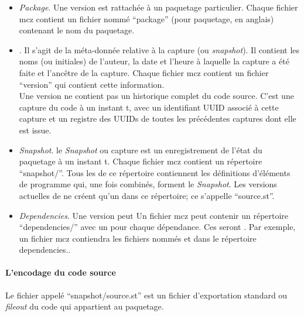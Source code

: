 \documentclass[a4paper,10pt,twoside]{book}
\begin{document}
\begin{itemize}
\item \emph{Package}. Une version est rattachée à un paquetage
  particulier. Chaque fichier mcz contient un fichier nommé
  ``package'' (pour paquetage, en anglais) contenant le nom du
  paquetage.
\item \emph{}. %
Il s'agit de la méta-donnée relative à la capture (ou
\emph{snapshot}). Il contient les noms (ou initiales) de l'auteur, la
date et l'heure à laquelle la capture a été faite et l'ancêtre de la
capture.
Chaque fichier mcz contient un fichier ``version'' qui contient cette
information.\\
Une version ne contient pas un historique complet du code
source. C'est une capture du code à un instant t, avec un identifiant
UUID associé à cette capture et un registre des UUIDs de toutes les
précédentes captures dont elle est issue.
\item \emph{Snapshot}. le \emph{Snapshot} ou capture est un
  enregistrement de l'état du paquetage à un instant t.
Chaque fichier mcz contient un répertoire
  ``snapshot/''. Tous les  de ce répertoire
  contiennent les %
  définitions d'éléments de programme qui, une fois combinés, forment
  le \emph{Snapshot}. Les versions actuelles de \MC ne créent qu'un
   dans ce répertoire; ce  s'appelle
``source.st''.
\item \emph{Dependencies}. Une version peut  Un fichier mcz peut contenir un
répertoire ``dependencies/'' avec un 
pour chaque dépendance. Ces  seront . Par exemple, un
fichier mcz  contiendra les fichiers nommés
 et  dans le répertoire dependencies..
\end{itemize} %

\paragraph{L'encodage du code source}%

Le fichier appelé ``snapshot/source.st'' est un fichier d'exportation standard
ou \emph{fileout} du code qui appartient au paquetage.
\end{document}

